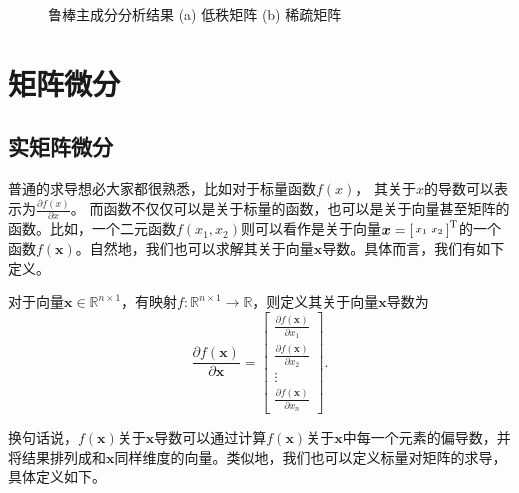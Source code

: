 \begin{solution}
\begin{figure}[htb!]
\begin{subfigure}{.3\textwidth}
            \caption{}
            \label{fig_rpca_result_2}
        \end{subfigure}
        \caption{鲁棒主成分分析结果 (a) 低秩矩阵 (b) 稀疏矩阵}
        \label{fig_rpca_result}
    \end{figure}
\end{solution}

\maybeNewPage

\section{矩阵微分}

\subsection{实矩阵微分}
普通的求导想必大家都很熟悉，比如对于标量函数$f(x)$， 其关于$x$的导数可以表示为\( \frac{\partial f(x)}{\partial x} \)。 而函数不仅仅可以是关于标量的函数，也可以是关于向量甚至矩阵的函数。比如，一个二元函数\( f(x_1, x_2) \)则可以看作是关于向量\( \boldsymbol{x} = \begin{bsmallmatrix} x_1 & x_2 \end{bsmallmatrix}^{\mathrm{T}} \)的一个函数\( f(\bm{x}) \)。自然地，我们也可以求解其关于向量\( \bm{x} \)导数。具体而言，我们有如下定义。

\begin{definition}[标量关于向量求导]
    对于向量$\bm{x} \in \mathbb{R}^{n \times 1}$，有映射\( f: \mathbb{R}^{n \times 1} \rightarrow \mathbb{R} \)，则定义其关于向量\( \bm{x} \)导数为
    \[
        \frac{\partial f(\bm{x})}{\partial \bm{x}}  =
        \begin{bmatrix}
            \frac{\partial f(\bm{x})}{\partial x_1} \\
            \frac{\partial f(\bm{x})}{\partial x_2} \\
            \vdots                                  \\
            \frac{\partial f(\bm{x})}{\partial x_n}
        \end{bmatrix}.
    \]
\end{definition}

换句话说，\( f(\bm{x}) \)关于\( \bm{x} \)导数可以通过计算\( f(\bm{x}) \)关于\( \bm{x} \)中每一个元素的偏导数，并将结果排列成和\( \bm{x} \)同样维度的向量。类似地，我们也可以定义标量对矩阵的求导，具体定义如下。

